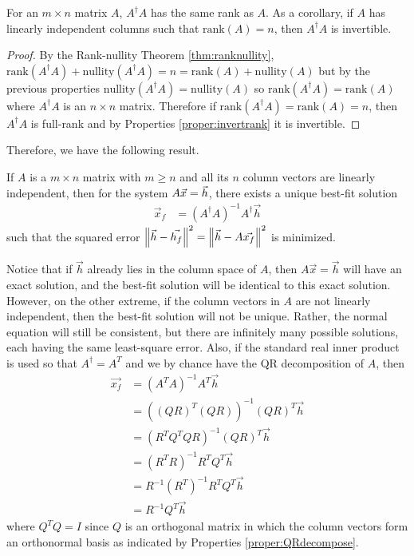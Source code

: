 \begin{proper}
\label{proper:AdagArank}
For an $m \times n$ matrix $A$, $A^\dag A$ has the same rank as $A$. As a corollary, if $A$ has linearly independent columns such that $\text{rank}(A) = n$, then $A^\dag A$ is invertible.
\end{proper}
\begin{proof}
By the Rank-nullity Theorem \ref{thm:ranknullity}, $\text{rank}(A^\dag A) + \text{nullity}(A^\dag A) = n = \text{rank}(A) + \text{nullity}(A)$ but by the previous properties $\text{nullity}(A^\dag A) = \text{nullity}(A)$ so $\text{rank}(A^\dag A) = \text{rank}(A)$ where $A^\dag A$ is an $n \times n$ matrix. Therefore if $\text{rank}(A^\dag A) = \text{rank}(A) = n$, then $A^\dag A$ is full-rank and by Properties \ref{proper:invertrank} it is invertible.
\end{proof}
Therefore, we have the following result.
\begin{thm}
\label{thm:bestfit}
If $A$ is a $m \times n$ matrix with $m \geq n$ and all its $n$ column vectors are linearly independent, then for the system $A\vec{x} = \smash{\vec{h}}$, there exists a unique best-fit solution
\begin{align}
\vec{x}_f &= (A^\dag A)^{-1}A^\dag \vec{h} \label{eqn:bestfit}
\end{align}
such that the squared error $\norm{\vec{h}-\vec{h_f}}^2 = \norm{\vec{h}-A\vec{x_f}}^2$ is minimized.
\end{thm}
Notice that if $\vec{h}$ already lies in the column space of $A$, then $A\vec{x} = \vec{h}$ will have an exact solution, and the best-fit solution will be identical to this exact solution. However, on the other extreme, if the column vectors in $A$ are not linearly independent, then the best-fit solution will not be unique. Rather, the normal equation will still be consistent, but there are infinitely many possible solutions, each having the same least-square error. Also, if the standard real inner product is used so that $A^\dag = A^T$ and we by chance have the QR decomposition of $A$, then
\begin{align}
\vec{x_f} &= (A^TA)^{-1}A^T\vec{h} \nonumber \\
&= ((QR)^T(QR))^{-1}(QR)^T\vec{h} \nonumber \\
&= (R^TQ^TQR)^{-1} (QR)^T\vec{h} \nonumber \\
&= (R^TR)^{-1} R^TQ^T \vec{h} \nonumber \\
&= R^{-1} (R^T)^{-1} R^TQ^T \vec{h} \nonumber \\
&= R^{-1} Q^T\vec{h}
\end{align}
where $Q^TQ = I$ since $Q$ is an orthogonal matrix in which the column vectors form an orthonormal basis as indicated by Properties \ref{proper:QRdecompose}.

